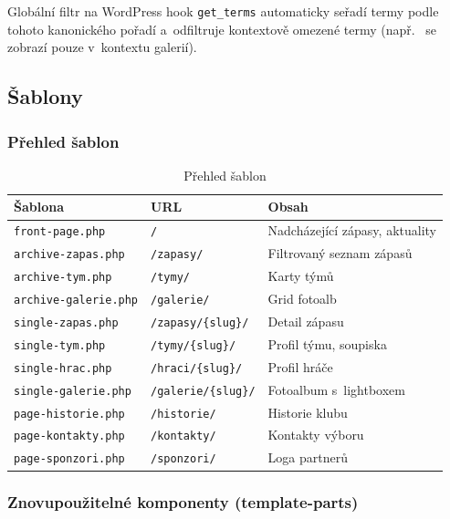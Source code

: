 \documentclass[12pt,a4paper]{article}
\begin{document}
Globální filtr na WordPress hook \texttt{get\_terms} automaticky seřadí termy podle tohoto kanonického pořadí a~odfiltruje kontextově omezené termy (např.\  se zobrazí pouze v~kontextu galerií).

\subsection{Šablony}

\subsubsection{Přehled šablon}

\begin{table}[H]
\centering
\small
\begin{tabularx}{\textwidth}{l l X}
\toprule
\textbf{Šablona} & \textbf{URL} & \textbf{Obsah} \\
\midrule
\texttt{front-page.php} & \texttt{/} & Nadcházející zápasy, aktuality \\
\texttt{archive-zapas.php} & \texttt{/zapasy/} & Filtrovaný seznam zápasů \\
\texttt{archive-tym.php} & \texttt{/tymy/} & Karty týmů \\
\texttt{archive-galerie.php} & \texttt{/galerie/} & Grid fotoalb \\
\texttt{single-zapas.php} & \texttt{/zapasy/\{slug\}/} & Detail zápasu \\
\texttt{single-tym.php} & \texttt{/tymy/\{slug\}/} & Profil týmu, soupiska \\
\texttt{single-hrac.php} & \texttt{/hraci/\{slug\}/} & Profil hráče \\
\texttt{single-galerie.php} & \texttt{/galerie/\{slug\}/} & Fotoalbum s~lightboxem \\
\texttt{page-historie.php} & \texttt{/historie/} & Historie klubu \\
\texttt{page-kontakty.php} & \texttt{/kontakty/} & Kontakty výboru \\
\texttt{page-sponzori.php} & \texttt{/sponzori/} & Loga partnerů \\
\bottomrule
\end{tabularx}
\caption{Přehled šablon}
\end{table}

\subsubsection{Znovupoužitelné komponenty (template-parts)}
\end{document}
